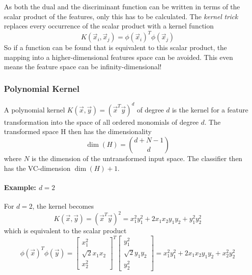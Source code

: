 			As both the dual and the discriminant function can be written in terms of the scalar product of the features, only this has to be calculated. The \emph{kernel trick} replaces every occurrence of the scalar product with a kernel function
			\begin{equation}
				K(\vec{x}_i, \vec{x}_j) = \phi(\vec{x}_i)^T \phi(\vec{x}_j)
			\end{equation}
			So if a function can be found that is equivalent to this scalar product, the mapping into a higher-dimensional features space can be avoided. This even means the feature space can be infinity-dimensional!

			\subsubsection{Polynomial Kernel}
				A polynomial kernel \( K(\vec{x}, \vec{y}) = (\vec{x}^T \vec{y})^d \) of degree \(d\) is the kernel for a feature transformation into the space of all ordered monomials of degree \(d\). The transformed space H then has the dimensionality
				\begin{equation}
					\dim(H) = { d + N - 1 \choose d }
				\end{equation}
				where \(N\) is the dimension of the untransformed input space. The classifier then has the VC-dimension \( \dim(H) + 1 \).
				
				\paragraph{Example: \(d = 2\)}
					For \(d = 2\), the kernel becomes
					\begin{equation}
						K(\vec{x}, \vec{y}) = (\vec{x}^T \vec{y})^2 = x_1^2 y_1^2 + 2 x_1 x_2 y_1 y_2 + y_1^2 y_2^2
					\end{equation}
					which is equivalent to the scalar product
					\begin{equation}
						\phi(\vec{x})^T \phi(\vec{y}) =
							\begin{bmatrix}
								x_1^2 \\
								\sqrt{2} x_1 x_2 \\
								x_2^2
							\end{bmatrix}^T
							\begin{bmatrix}
								y_1^2 \\
								\sqrt{2} y_1 y_2 \\
								y_2^2
							\end{bmatrix}
						= x_1^2 y_1^2 + 2 x_1 x_2 y_1 y_2 + x_2^2 y_2^2
					\end{equation}

